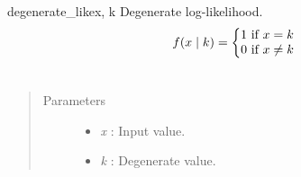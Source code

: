 \hypertarget{pymc.distributions.degenerate_like}{}\begin{funcdesc}{degenerate\_like}{x, k}
Degenerate log-likelihood.
\begin{gather}
\begin{split}f(x \mid k) = \left\{ \begin{matrix} 1 \text{ if } x = k \\ 0 \text{ if } x \ne k\end{matrix} \right.\end{split}\notag\\\begin{split}\end{split}\notag
\end{gather}\begin{quote}\begin{description}
\item[Parameters] \leavevmode\begin{itemize}
\item {} 
\emph{x} : Input value.

\item {} 
\emph{k} : Degenerate value.

\end{itemize}

\end{description}\end{quote}
\end{funcdesc}


